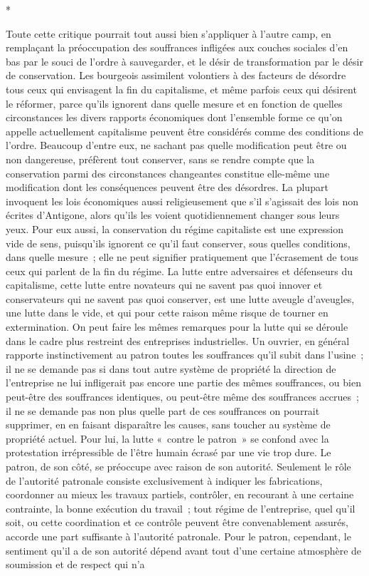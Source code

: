 \documentclass[french,twoside]{book} %
\begin{document}
\begin{center}
\noindent \centerline{*}\par
\end{center}

\noindent Toute cette critique pourrait tout aussi bien s'appliquer à l'autre camp, en remplaçant la préoccupation des souffrances infligées aux couches sociales d'en bas par le souci de l'ordre à sauvegarder, et le désir de transformation par le désir de conservation. Les bourgeois assimilent volontiers à des facteurs de désordre tous ceux qui envisagent la fin du capitalisme, et même parfois ceux qui désirent le réformer, parce qu'ils ignorent dans quelle mesure et en fonction de quelles circonstances les divers rapports économiques dont l'ensemble forme ce qu'on appelle actuellement capitalisme peuvent être con­sidérés comme des conditions de l'ordre. Beaucoup d'entre eux, ne sachant pas quelle modification peut être ou non dangereuse, préfèrent tout conserver, sans se rendre compte que la conservation parmi des circonstances changean­tes constitue elle-même une modification dont les conséquences peuvent être des désordres. La plupart invoquent les lois économiques aussi religieusement que s'il s'agissait des lois non écrites d'Antigone, alors qu'ils les voient quotidiennement changer sous leurs yeux. Pour eux aussi, la conservation du régime capitaliste est une expression vide de sens, puisqu'ils ignorent ce qu'il faut conserver, sous quelles conditions, dans quelle mesure ; elle ne peut signifier pratiquement que l'écrasement de tous ceux qui parlent de la fin du régime. La lutte entre adversaires et défenseurs du capitalisme, cette lutte entre novateurs qui ne savent pas quoi innover et conservateurs qui ne savent pas quoi conserver, est une lutte aveugle d'aveugles, une lutte dans le vide, et qui pour cette raison même risque de tourner en extermination. On peut faire les mêmes remarques pour la lutte qui se déroule dans le cadre plus restreint des entreprises industrielles. Un ouvrier, en général rapporte instinctivement au patron toutes les souffrances qu'il subit dans l'usine ; il ne se demande pas si dans tout autre système de propriété la direction de l'entreprise ne lui infligerait pas encore une partie des mêmes souffrances, ou bien peut-être des souffrances identiques, ou peut-être même des souffrances accrues ; il ne se demande pas non plus quelle part de ces souffrances on pourrait supprimer, en en faisant disparaître les causes, sans toucher au système de propriété actuel. Pour lui, la lutte « contre le patron » se confond avec la protestation irrépres­sible de l'être humain écrasé par une vie trop dure. Le patron, de son côté, se préoccupe avec raison de son autorité. Seulement le rôle de l'autorité patronale consiste exclusivement à indiquer les fabrications, coordonner au mieux les travaux partiels, contrôler, en recourant à une certaine contrainte, la bonne exécution du travail ; tout régime de l'entreprise, quel qu'il soit, ou cette coordination et ce contrôle peuvent être convenablement assurés, accorde une part suffisante à l'autorité patronale. Pour le patron, cependant, le sentiment qu'il a de son autorité dépend avant tout d'une certaine atmosphère de soumis­sion et de respect qui n'a 
\end{document}
